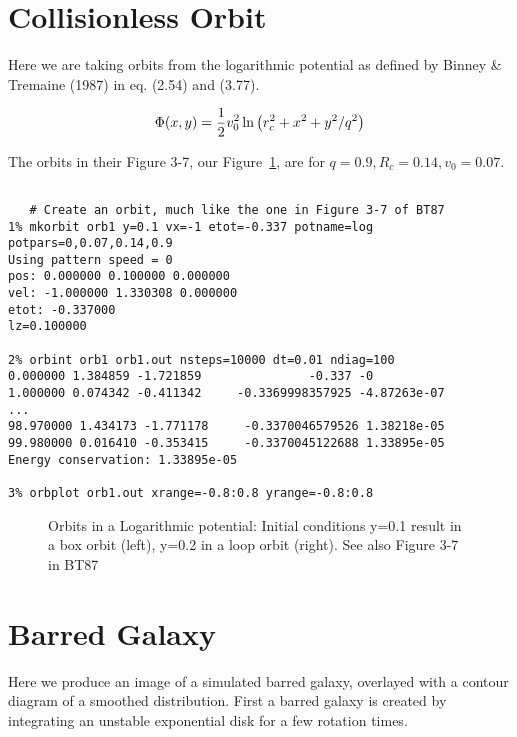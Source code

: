 \section{Collisionless Orbit}

Here we are taking orbits from the logarithmic potential as defined
by Binney \& Tremaine (1987) in eq. (2.54) and (3.77).

$$
   \Phi(x,y) = {1\over 2} v_0^2
                    \ln{ \left( r_c^2 + x^2  + y^2/q^2 \right) }
$$

The orbits in their Figure 3-7, our Figure~\ref{f:log}, are for
$q=0.9, R_c=0.14, v_0=0.07$.

\footnotesize\begin{verbatim}

   # Create an orbit, much like the one in Figure 3-7 of BT87
1% mkorbit orb1 y=0.1 vx=-1 etot=-0.337 potname=log potpars=0,0.07,0.14,0.9
Using pattern speed = 0
pos: 0.000000 0.100000 0.000000
vel: -1.000000 1.330308 0.000000
etot: -0.337000
lz=0.100000

2% orbint orb1 orb1.out nsteps=10000 dt=0.01 ndiag=100
0.000000 1.384859 -1.721859               -0.337 -0
1.000000 0.074342 -0.411342     -0.3369998357925 -4.87263e-07
...
98.970000 1.434173 -1.771178     -0.3370046579526 1.38218e-05
99.980000 0.016410 -0.353415     -0.3370045122688 1.33895e-05
Energy conservation: 1.33895e-05

3% orbplot orb1.out xrange=-0.8:0.8 yrange=-0.8:0.8

\end{verbatim}\normalsize

\begin{figure}[t]
\caption[Orbits in a Logarithmic potential]
{Orbits in a Logarithmic potential:
Initial conditions y=0.1 result in a box orbit (left), 
y=0.2 in a loop orbit (right). See also Figure 3-7 in BT87}
\label{f:log}
\end{figure}

\section{Barred Galaxy}

Here we produce an image of a simulated barred galaxy, overlayed with a contour diagram
of a smoothed distribution. First a barred galaxy is created by
integrating an unstable exponential disk for a few rotation times.

